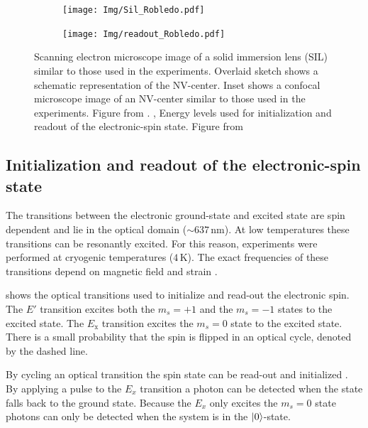 \begin{figure}[htbp]
    \centering
    \begin{subfigure}[t]{0.49\textwidth}\centering
        \caption{}
        \label{fig:Sil_Robledo}
        \texttt{[image: Img/Sil\_Robledo.pdf]}
    \end{subfigure}
    \begin{subfigure}[t]{0.49\textwidth}\centering
       \caption{}
       \label{fig:readoutRobledo}
       \texttt{[image: Img/readout\_Robledo.pdf]}
   \end{subfigure}
   \caption{\textbf{} Scanning electron microscope image of a solid immersion lens (SIL) similar to those used in the experiments. Overlaid sketch shows a schematic representation of the NV-center. Inset shows a confocal microscope image of an NV-center similar to those used in the experiments. Figure from \citet{Robledo2011HighFidelity}.  \textbf{}, Energy levels used for initialization and readout of the electronic-spin state. Figure from \citet{Robledo2011HighFidelity}}
\end{figure}

\subsection{Initialization and readout of the electronic-spin state}
The transitions between the electronic ground-state and excited state are spin dependent and lie in the optical domain ($\sim 637\, \mathrm{ nm}$).
At low temperatures these transitions can be resonantly excited.
For this reason, experiments were performed at cryogenic temperatures ($4\,\mathrm{K}$).
The exact frequencies of these transitions depend on magnetic field and strain \citep{Hensen2011MeasurementBased}.

 shows the optical transitions used to initialize and read-out the electronic spin.
The $E'$ transition excites both the $m_s =+1$ and the $m_s=-1$ states to the excited state.
The $E_\mathrm{x}$ transition excites the $m_s = 0$ state to the excited state.
There is a small probability that the spin is flipped in an optical cycle, denoted by the dashed line.

By cycling an optical transition the spin state can be read-out and initialized \citep{Robledo2011HighFidelity}.
By applying a pulse to the $E_x$ transition a photon can be detected when the state falls back to the ground state.
Because the $E_x$ only excites the $m_s=0$ state photons can only be detected when the system is in the ${\left\vert{0}\right\rangle}$-state.


